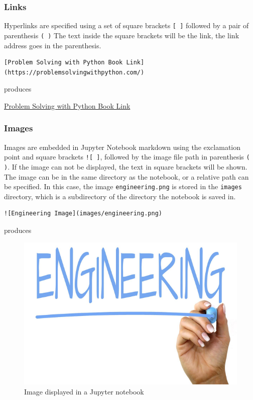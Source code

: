 \documentclass{book}
\makeatletter
\def\maxwidth{\ifdim\Gin@nat@width>\linewidth\linewidth
    \else\Gin@nat@width\fi}
\let\Oldincludegraphics\includegraphics
\renewcommand{\includegraphics}[1]{\Oldincludegraphics[width=.8\maxwidth]{#1}}
\makeatother
\begin{document}
\subsubsection{Links}\label{links}

Hyperlinks are specified using a set of square brackets \lstinline![ ]!
followed by a pair of parenthesis \lstinline!( )! The text inside the
square brackets will be the link, the link address goes in the
parenthesis.

\begin{lstlisting}
[Problem Solving with Python Book Link](https://problemsolvingwithpython.com/)
\end{lstlisting}

produces

\href{https://problemsolvingwithpython.com/}{Problem Solving with Python
Book Link}

\subsubsection{Images}\label{images}

Images are embedded in Jupyter Notebook markdown using the exclamation
point and square brackets \lstinline"![ ]", followed by the image file
path in parenthesis \lstinline!( )!. If the image can not be displayed,
the text in square brackets will be shown. The image can be in the same
directory as the notebook, or a relative path can be specified. In this
case, the image \lstinline!engineering.png! is stored in the
\lstinline!images! directory, which is a subdirectory of the directory
the notebook is saved in.

\begin{lstlisting}
![Engineering Image](images/engineering.png)
\end{lstlisting}

produces

\begin{figure}
\centering
\includegraphics{images/engineering.png}
\caption{Image displayed in a Jupyter notebook}
\end{figure}
\end{document}
